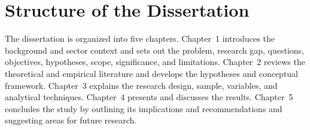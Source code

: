 \section{Structure of the Dissertation}

The dissertation is organized into five chapters. Chapter~1 introduces the background and sector context and sets out the problem, research gap, questions, objectives, hypotheses, scope, significance, and limitations. Chapter~2 reviews the theoretical and empirical literature and develops the hypotheses and conceptual framework. Chapter~3 explains the research design, sample, variables, and analytical techniques. Chapter~4 presents and discusses the results. Chapter~5 concludes the study by outlining its implications and recommendations and suggesting areas for future research.
